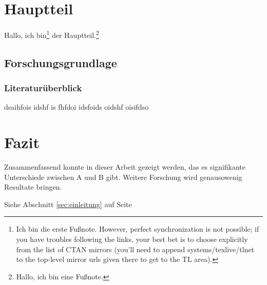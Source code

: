 \documentclass[ngerman]{scrreprt}
\begin{document}
\section{Hauptteil}

Hallo, ich bin\footnote{Ich bin die erste Fußnote. However, perfect synchronization is not possible; if you have troubles following the links, your best bet is to choose explicitly from the list of CTAN mirrors (you'll need to append systems/texlive/tlnet to the top-level mirror urls given there to get to the TL area).} der Hauptteil.\footnote{Hallo, ich bin eine Fußnote.}

\subsection{Forschungsgrundlage}

\subsubsection{Literaturüberblick}

dsaihfois idshf is fhfdoi idsfoids oidshf oisifdso


\section{Fazit}

Zusammenfassend konnte in dieser Arbeit gezeigt werden, das es signifikante Unterschiede zwischen A und B gibt. Weitere Forschung wird genausowenig Resultate bringen.

Siehe Abschnitt \ref{sec:einleitung} auf Seite \pageref{sec:einleitung}
\end{document}
